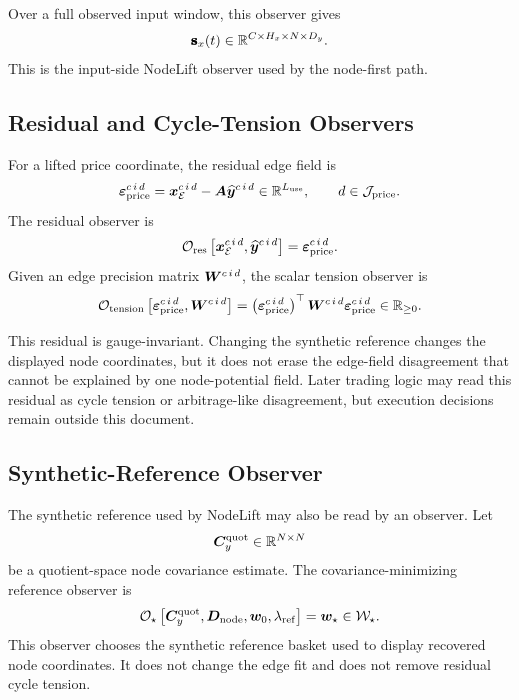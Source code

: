 Over a full observed input window, this observer gives
\[
  \pmb{\mathbf{s}}_{x}(t)
  \in
  \mathbb{R}^{C\times H_x\times N\times D_y}.
\]
This is the input-side NodeLift observer used by the node-first path.

\subsection{Residual and Cycle-Tension Observers}
\label{subsec:residual-and-cycle-tension-observers}

For a lifted price coordinate, the residual edge field is
\[
  \bm{\varepsilon}_{\mathrm{price}}^{c\,i\,d}
  =
  \bm{x}_{\mathcal{E}}^{c\,i\,d}
  -
  \bm{A}
  \widehat{\bm{y}}^{c\,i\,d}
  \in
  \mathbb{R}^{L_{\mathrm{use}}},
  \qquad
  d\in\mathcal{J}_{\mathrm{price}}.
\]
The residual observer is
\[
  \mathcal{O}_{\mathrm{res}}
  \left[
    \bm{x}_{\mathcal{E}}^{c\,i\,d},
    \widehat{\bm{y}}^{c\,i\,d}
  \right]
  =
  \bm{\varepsilon}_{\mathrm{price}}^{c\,i\,d}.
\]
Given an edge precision matrix $\bm{W}^{c\,i\,d}$, the scalar tension observer is
\[
  \mathcal{O}_{\mathrm{tension}}
  \left[
    \bm{\varepsilon}_{\mathrm{price}}^{c\,i\,d},
    \bm{W}^{c\,i\,d}
  \right]
  =
  \left(
    \bm{\varepsilon}_{\mathrm{price}}^{c\,i\,d}
  \right)^{\top}
  \bm{W}^{c\,i\,d}
  \bm{\varepsilon}_{\mathrm{price}}^{c\,i\,d}
  \in
  \mathbb{R}_{\ge 0}.
\]

This residual is gauge-invariant.  Changing the synthetic reference changes the
displayed node coordinates, but it does not erase the edge-field disagreement
that cannot be explained by one node-potential field.  Later trading logic may
read this residual as cycle tension or arbitrage-like disagreement, but
execution decisions remain outside this document.

\subsection{Synthetic-Reference Observer}
\label{subsec:synthetic-reference-observer}

The synthetic reference used by NodeLift may also be read by an observer.  Let
\[
  \bm{C}_{y}^{\mathrm{quot}}
  \in
  \mathbb{R}^{N\times N}
\]
be a quotient-space node covariance estimate.  The covariance-minimizing
reference observer is
\[
  \mathcal{O}_{\star}
  \left[
    \bm{C}_{y}^{\mathrm{quot}},
    \bm{D}_{\mathrm{node}},
    \bm{w}_0,
    \lambda_{\mathrm{ref}}
  \right]
  =
  \bm{w}_{\star}
  \in
  \mathcal{W}_{\star}.
\]
This observer chooses the synthetic reference basket used to display recovered
node coordinates.  It does not change the edge fit and does not remove residual
cycle tension.

